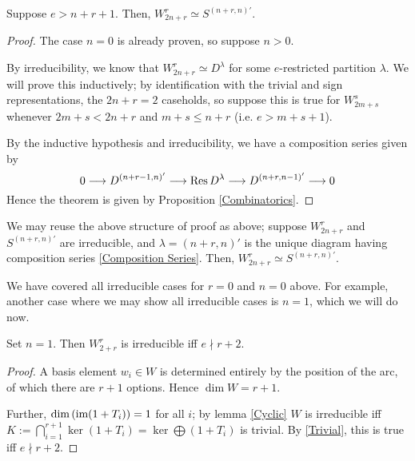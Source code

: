 \documentclass{amsart}
\begin{document}
\begin{theorem}
  Suppose $e > n + r + 1$.
  Then, $W_{2n + r}^r \simeq S^{(n+r,n)'}$.
\end{theorem}
\begin{proof}
  The case $n = 0$ is already proven, so suppose $n > 0$.

  By irreducibility, we know that $W_{2n + r}^r \simeq D^\lambda$ for some $e$-restricted partition $\lambda$.
  We will prove this inductively; by identification with the trivial and sign representations, the $2n + r = 2$ caseholds, so suppose this is true for $W_{2m + s}^s$ whenever $2m + s < 2n + r$ and $m + s \leq n + r$ (i.e. $e > m + s + 1$).

  By the inductive hypothesis and irreducibility, we have a composition series given by 
  \begin{equation}
    \label{Composition Series} 0 \longrightarrow D^{(n + r - 1,n)'} \longrightarrow \text{Res} \, D^\lambda \longrightarrow D^{(n+r,n-1)'} \longrightarrow 0
   \end{equation}
  Hence the theorem is given by Proposition \ref{Combinatorics}.
\end{proof}

\iffalse
We may reuse the above structure of proof as above;
suppose $W_{2n + r}^r$ and $S^{(n+r,n)'}$ are irreducible, and $\lambda = (n+r,n)'$ is the unique diagram having composition series \eqref{Composition Series}.
Then, $W_{2n + r}^r \simeq S^{(n+r,n)'}$.

We have covered all irreducible cases for $r = 0$ and $n = 0$ above.
For example, another case where we may show all irreducible cases is $n = 1$, which we will do now.
\begin{lemma}\label{n=1 irreducibility}
    Set $n = 1$. 
    Then $W_{2 + r}^r$ is irreducible iff $e \nmid r + 2$.
\end{lemma}
\begin{proof}
  A basis element $w_i \in W$ is determined entirely by the position of the arc, of which there are $r + 1$ options.
  Hence $\dim W = r + 1$.

  Further, $\text{dim}\left( \text{im} (1 + T_i) \right) = 1$ for all $i$;
  by lemma \ref{Cyclic} $W$ is irreducible iff $K := \bigcap_{i = 1}^{r+1} \ker (1 + T_i) = \ker \bigoplus (1 + T_i)$ is trivial.
  By \ref{Trivial}, this is true iff $e \nmid r + 2$.
\end{proof}
\end{document}
